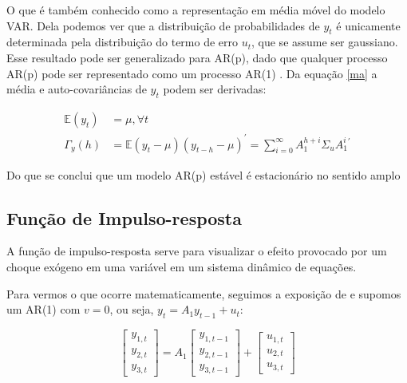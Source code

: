 \documentclass[a4paper,
               article,
               12pt,
               openany,
               oneside,
               english,
               brazil]{abntex2}
\numberwithin{equation}{section}
\begin{document}
    O que é também conhecido como a representação em média móvel do modelo VAR\@. Dela podemos ver que a distribuição de probabilidades de $ y_t $ é unicamente determinada pela distribuição do termo de erro $ u_t $, que se assume ser gaussiano. Esse resultado pode ser generalizado para AR(p), dado que qualquer processo AR(p) pode ser representado como um processo AR(1) \cite[p.~15]{lutkepool}. Da equação \eqref{ma} a média e auto-covariâncias de $ y_t $ podem ser derivadas: 

    \begin{align*}
        \label{momentos}
        \mathbb{E}(y_t) &= \mu, \forall t \\
        \Gamma_y (h) &= \mathbb{E}(y_t - \mu)(y_{t-h} - \mu)^{'} = \sum_{i=0}^{\infty}A_1^{h+i}\Sigma_uA_1^{i}^{'}
    \end{align*}

    Do que se conclui que um modelo AR(p) estável é estacionário no sentido amplo \cite[p.~15-16]{lutkepool}

    \subsection{Função de Impulso-resposta}

    A função de impulso-resposta serve para visualizar o efeito provocado por um choque exógeno em uma variável em um sistema dinâmico de equações.

    Para vermos o que ocorre matematicamente, seguimos a exposição de \textcite[p.~51-53]{lutkepool} e supomos um AR(1) com $ v = 0 $, ou seja, $ y_t = A_1 y_{t-1} + u_t $:

    \begin{equation*}
        \label{impulse-response}
        \begin{bmatrix}
            y_{1,t} \\
            y_{2,t} \\
            y_{3,t}
        \end{bmatrix} =
        A_1
        \begin{bmatrix}
            y_{1,t-1} \\
            y_{2,t-1} \\
            y_{3,t-1}
        \end{bmatrix} +
        \begin{bmatrix}
            u_{1,t} \\
            u_{2,t} \\
            u_{3,t}
        \end{bmatrix}
    \end{equation*}
\end{document}
